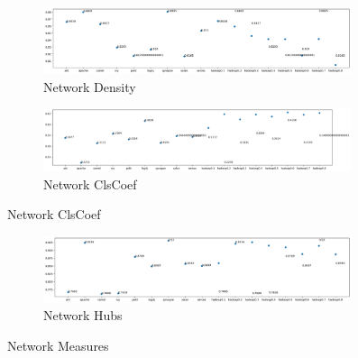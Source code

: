 \begin{figure}[h!]
    \centering
    \begin{subfigure}{0.496\textwidth}
        \includegraphics[width=0.99\textwidth]{figures/network-Density.png}
        \caption{Network Density}
        \label{fig:network-density}
    \end{subfigure}
    \begin{subfigure}{0.496\textwidth}
        \includegraphics[width=0.99\textwidth]{figures/network-ClsCoef.png}
        \caption{Network ClsCoef}
        \label{fig:network-clscoef}
    \end{subfigure}
\end{figure}
\begin{figure}[h!]\ContinuedFloat
    \centering
    \begin{subfigure}{0.496\textwidth}
        \includegraphics[width=0.99\textwidth]{figures/network-Hubs.png}
        \caption{Network Hubs}
        \label{fig:network-hubs}
    \end{subfigure}
    \caption{Network Measures}
    \label{fig:network}
\end{figure}

